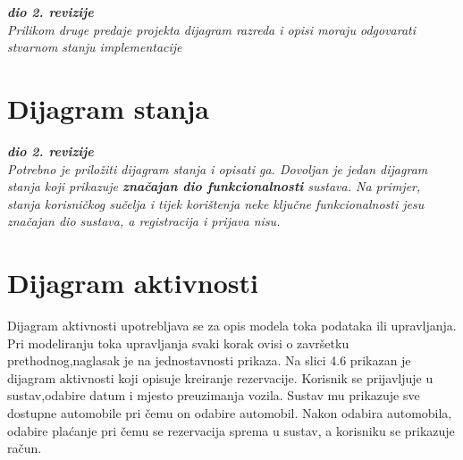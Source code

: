 			\textbf{\textit{dio 2. revizije}}\\			
			
			\textit{Prilikom druge predaje projekta dijagram razreda i opisi moraju odgovarati stvarnom stanju implementacije}
			
			
			
			\eject
		
		\section{Dijagram stanja}
			
			
			\textbf{\textit{dio 2. revizije}}\\
			
			\textit{Potrebno je priložiti dijagram stanja i opisati ga. Dovoljan je jedan dijagram stanja koji prikazuje \textbf{značajan dio funkcionalnosti} sustava. Na primjer, stanja korisničkog sučelja i tijek korištenja neke ključne funkcionalnosti jesu značajan dio sustava, a registracija i prijava nisu. }
			
			
			\eject 
		
		\section{Dijagram aktivnosti}
			
			\noindent Dijagram aktivnosti upotrebljava se za opis modela toka podataka ili upravljanja. Pri modeliranju toka upravljanja svaki korak ovisi o završetku prethodnog,naglasak je na jednostavnosti prikaza. Na slici 4.6 prikazan je dijagram aktivnosti koji opisuje kreiranje rezervacije. Korisnik se prijavljuje u sustav,odabire datum i mjesto preuzimanja vozila. Sustav mu prikazuje sve dostupne automobile pri čemu on odabire automobil. Nakon odabira automobila, odabire plaćanje pri čemu se rezervacija sprema u sustav, a korisniku se prikazuje račun.
			
